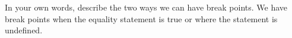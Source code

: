 {In your own words, describe the two ways we can have break points.}
{We have break points when the equality statement is true or where the statement is undefined.}
